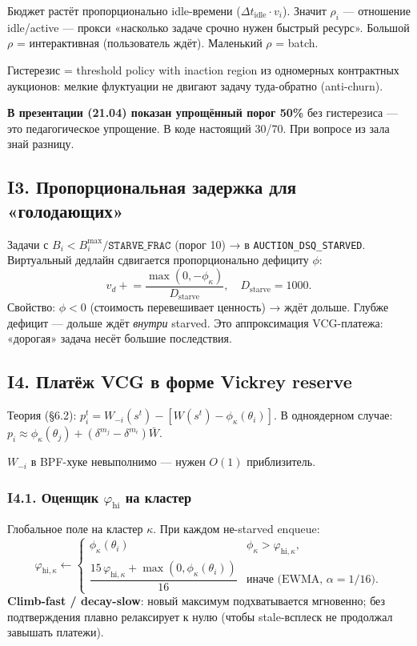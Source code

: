 \documentclass[11pt,a4paper]{article}
\begin{document}
\begin{why}
Бюджет растёт пропорционально idle-времени ($\Delta t_{\text{idle}}\cdot v_i$).
Значит $\rho_i$ — отношение idle/active — прокси «насколько задаче
срочно нужен быстрый ресурс». Большой $\rho$ = интерактивная
(пользователь ждёт). Маленький $\rho$ = batch.

Гистерезис = threshold policy with inaction region из одномерных
контрактных аукционов: мелкие флуктуации не двигают задачу
туда-обратно (anti-churn).
\end{why}

\textbf{В презентации (21.04) показан упрощённый порог 50\%}
без гистерезиса — это педагогическое упрощение. В коде настоящий
30/70. При вопросе из зала знай разницу.

\subsection{I3. Пропорциональная задержка для «голодающих»}

Задачи с $B_i<B_i^{\max}/\mathtt{STARVE\_FRAC}$ (порог 10) → в
\texttt{AUCTION\_DSQ\_STARVED}. Виртуальный дедлайн сдвигается
пропорционально дефициту $\phi$:
\[
v_d \mathrel{+}= \frac{\max(0, -\phi_\kappa)}{D_{\text{starve}}},\quad
D_{\text{starve}}=1000.
\]
Свойство: $\phi<0$ (стоимость перевешивает ценность) → ждёт дольше.
Глубже дефицит — дольше ждёт \emph{внутри} starved. Это аппроксимация
VCG-платежа: «дорогая» задача несёт большие последствия.

\subsection{I4. Платёж VCG в форме Vickrey reserve}

Теория (§6.2): $p_i^t=W_{-i}(s^t)-[W(s^t)-\phi_\kappa(\theta_i)]$.
В одноядерном случае: $p_i\approx\phi_\kappa(\theta_j)+(\delta^{m_j}-\delta^{m_i})\bar W$.

$W_{-i}$ в BPF-хуке невыполнимо — нужен $O(1)$ приблизитель.

\subsubsection{I4.1. Оценщик $\varphi_{\text{hi}}$ на кластер}

Глобальное поле на кластер $\kappa$. При каждом не-starved enqueue:
\[
\varphi_{\text{hi},\kappa}\leftarrow\begin{cases}
\phi_\kappa(\theta_i) & \phi_\kappa > \varphi_{\text{hi},\kappa},\\
\dfrac{15\,\varphi_{\text{hi},\kappa} + \max(0,\phi_\kappa(\theta_i))}{16} & \text{иначе (EWMA, }\alpha=1/16\text{)}.
\end{cases}
\]
\textbf{Climb-fast / decay-slow}: новый максимум подхватывается мгновенно;
без подтверждения плавно релаксирует к нулю (чтобы stale-всплеск не
продолжал завышать платежи).
\end{document}
